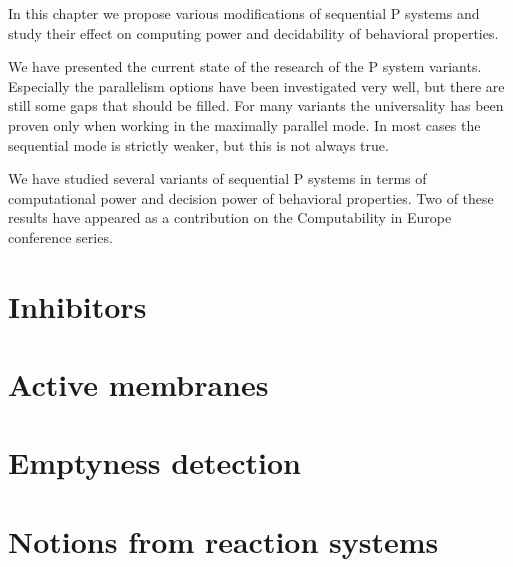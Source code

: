 In this chapter we propose various modifications of sequential P systems and study their effect on computing power and decidability of behavioral properties.

We have presented the current state of the research of the P system variants. Especially the parallelism options have been investigated very well, but there are still some gaps that should be filled. For many variants the universality has been proven only when working in the maximally parallel mode. In most cases the sequential mode is strictly weaker, but this is not always true.

We have studied several variants of sequential P systems in terms of computational power and decision power of behavioral properties. Two of these results have appeared as a contribution on the Computability in Europe conference series.

\section{Inhibitors} %
\label{sec:inhibitors}


\section{Active membranes} %
\label{sec:active_membranes}


\section{Emptyness detection} %
\label{sec:emptyness_detection}


\section{Notions from reaction systems} %
\label{sec:notions_from_reaction_systems}

